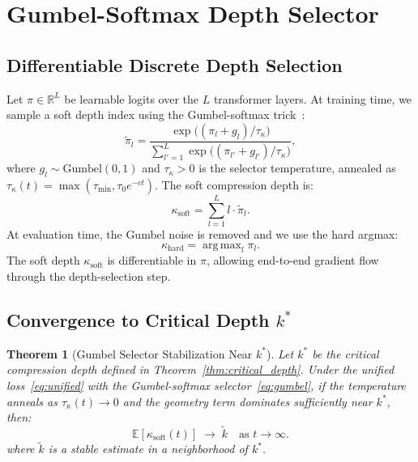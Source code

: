 \documentclass[lettersize,journal]{IEEEtran}
\newtheorem{theorem}{Theorem}
\newcommand{\R}{\mathbb{R}}
\newcommand{\E}{\mathbb{E}}
\DeclareMathOperator*{\argmax}{arg\,max}
\begin{document}
\section{Gumbel-Softmax Depth Selector}
\label{sec:selector}

\subsection{Differentiable Discrete Depth Selection}

Let $\pi \in \R^L$ be learnable logits over the $L$ transformer
layers.
At training time, we sample a soft depth index using the
Gumbel-softmax trick~\cite{jang2017categorical,maddison2017concrete}:
\begin{equation}
  \tilde{\pi}_l = \frac{\exp\!\bigl((\pi_l + g_l) / \tau_\kappa\bigr)}
                {\sum_{l'=1}^L \exp\!\bigl((\pi_{l'} + g_{l'}) / \tau_\kappa\bigr)},
  \label{eq:gumbel}
\end{equation}
where $g_l \sim \text{Gumbel}(0,1)$ and $\tau_\kappa > 0$ is
the selector temperature, annealed as
$\tau_\kappa(t) = \max(\tau_{\min}, \tau_0 e^{-ct})$.
The soft compression depth is:
\begin{equation}
  \kappa_{\text{soft}} = \sum_{l=1}^L l \cdot \tilde{\pi}_l.
  \label{eq:kappa_soft}
\end{equation}
At evaluation time, the Gumbel noise is removed and we use the
hard argmax:
\begin{equation}
  \kappa_{\text{hard}} = \argmax_l \pi_l.
  \label{eq:kappa_hard}
\end{equation}
The soft depth $\kappa_{\text{soft}}$ is differentiable in $\pi$,
allowing end-to-end gradient flow through the depth-selection step.

\subsection{Convergence to Critical Depth $k^*$}

\begin{theorem}[Gumbel Selector Stabilization Near $k^*$]
\label{thm:kappa_convergence}
Let $k^*$ be the critical compression depth defined in
Theorem~\ref{thm:critical_depth}.
Under the unified loss~\eqref{eq:unified} with the Gumbel-softmax
selector~\eqref{eq:gumbel}, if the temperature anneals as
$\tau_\kappa(t) \to 0$ and the geometry term dominates sufficiently
near $k^*$, then:
\begin{equation}
  \E[\kappa_{\text{soft}}(t)] \;\to\; \tilde{k}
  \quad\text{as } t \to \infty.
  \label{eq:kappa_conv}
\end{equation}
where $\tilde{k}$ is a stable estimate in a neighborhood of $k^*$.
\end{theorem}
\end{document}
